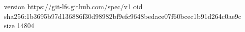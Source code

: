 version https://git-lfs.github.com/spec/v1
oid sha256:1b3695b97d136886f30d98982bf9efc9648bedace07f60bcec1b91d264c0ae9c
size 14804
